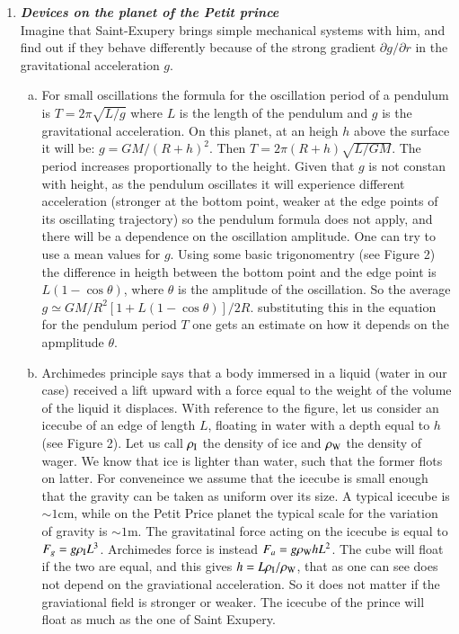 \documentclass[a4paper,12pt]{article}
\newcommand{\question}[1]{\textbf{\textit{#1}}}
\begin{document}
\begin{enumerate}
\item \question{Devices on the planet of the Petit prince}\\
Imagine that Saint-Exupery brings simple mechanical systems with him, and find out if they behave differently because of the strong gradient $\partial g/\partial r$ in the gravitational acceleration $g$.
\begin{enumerate}[(a)]
\item{For small oscillations the formula for the oscillation period of
  a pendulum is $T=2\pi\sqrt{L/g}$ where $L$ is the length of the
  pendulum and $g$ is the gravitational acceleration. On this planet,
  at an heigh $h$ above the surface it will be:
  $g=GM/(R+h)^2$. Then $T=2\pi (R+h)\sqrt{L/GM}$. The period increases
  proportionally to the height. Given that $g$ is not constan with
  height, as the pendulum oscillates it will experience different
  acceleration (stronger at the bottom point, weaker at the edge points
  of its oscillating trajectory) so the pendulum formula does not
  apply, and there will be a dependence on the oscillation
  amplitude. One can try to use a mean values for $g$. Using some
  basic trigonomentry (see Figure 2) the difference in heigth between the bottom
  point and the edge point is $L(1-\cos{\theta})$, where $\theta$ is
  the amplitude of the oscillation. So the average $g \simeq
  GM/R^2[1+L(1-\cos{\theta})]/2R$. substituting this in the equation
  for the pendulum period $T$ one gets an estimate on how it depends
  on the apmplitude $\theta$.}
\item{Archimedes principle says that a body immersed in a liquid
    (water in our case) received a lift upward with a force equal to
    the weight of the volume of the liquid it displaces. With
    reference to the figure, let us consider an icecube of an edge of
    length $L$, floating in water with a depth equal to $h$ (see
    Figure 2). Let us
    call $\rho_{\rm I}$ the density of ice and $\rho_{\rm W}$ the
    density of wager. We know that ice is lighter than water, such
    that the former flots on latter. For conveneince we assume that
    the icecube is small enough that the gravity can be taken as
    uniform over its size. A typical icecube is $\sim 1$cm, while on
    the Petit Price planet the typical scale for the variation of
    gravity is $\sim 1$m. The gravitatinal force acting on
    the icecube is equal to $F_g=g\rho_{\rm I}L^3$. Archimedes force
  is instead $F_a=g\rho_{\rm W} h L^2$. The cube will float if the two
are equal, and this gives $h= L\rho_{\rm I}/\rho_{\rm W}$, that as one
can see does not depend on the graviational acceleration. So it does
not matter if the graviational field is stronger or weaker. The
icecube of the prince will float as much as the one of Saint Exupery.}



\end{enumerate}
\end{enumerate}
\end{document}
